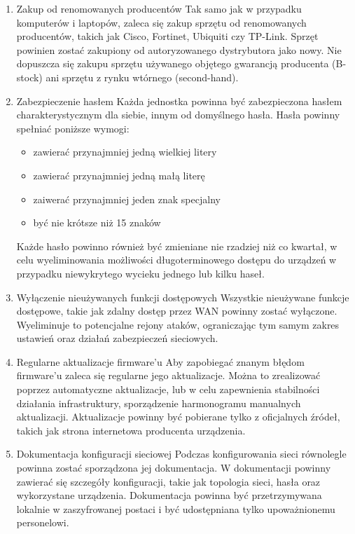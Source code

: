 \documentclass[12pt,a4paper]{article}
\begin{document}
\begin{enumerate}
    \item Zakup od renomowanych producentów Tak samo jak w przypadku komputerów i laptopów, zaleca się zakup sprzętu od renomowanych producentów, takich jak Cisco, Fortinet, Ubiquiti czy TP-Link. Sprzęt powinien zostać zakupiony od autoryzowanego dystrybutora jako nowy. Nie dopuszcza się zakupu sprzętu używanego objętego gwarancją producenta (B-stock) ani sprzętu z rynku wtórnego (second-hand).
    \item Zabezpieczenie hasłem Każda jednostka powinna być zabezpieczona hasłem charakterystycznym dla siebie, innym od domyślnego hasła. Hasła powinny spełniać poniższe wymogi:
    \begin{itemize}
        \item zawierać przynajmniej jedną wielkiej litery
        \item zawierać przynajmniej jedną małą literę
        \item zaiwerać przynajmniej jeden znak specjalny
        \item być nie krótsze niż 15 znaków
    \end{itemize}
    Każde hasło powinno również być zmieniane nie rzadziej niż co kwartał, w celu wyeliminowania możliwości długoterminowego dostępu do urządzeń w przypadku niewykrytego wycieku jednego lub kilku haseł.
    \item Wyłączenie nieużywanych funkcji dostępowych Wszystkie nieużywane funkcje dostępowe, takie jak zdalny dostęp przez WAN powinny zostać wyłączone. Wyeliminuje to potencjalne rejony ataków, ograniczając tym samym zakres ustawień oraz działań zabezpieczeń sieciowych.
    \item Regularne aktualizacje firmware'u Aby zapobiegać znanym błędom firmware'u zaleca się regularne jego aktualizacje. Można to zrealizować poprzez automatyczne aktualizacje, lub w celu zapewnienia stabilności działania infrastruktury, sporządzenie harmonogramu manualnych aktualizacji. Aktualizacje powinny być pobierane tylko z oficjalnych źródeł, takich jak strona internetowa producenta urządzenia.
    \item Dokumentacja konfiguracji sieciowej Podczas konfigurowania sieci równolegle powinna zostać sporządzona jej dokumentacja. W dokumentacji powinny zawierać się szczegóły konfiguracji, takie jak topologia sieci, hasła oraz wykorzystane urządzenia. Dokumentacja powinna być przetrzymywana lokalnie w zaszyfrowanej postaci i być udostępniana tylko upoważnionemu personelowi.
\end{enumerate}
\end{document}
